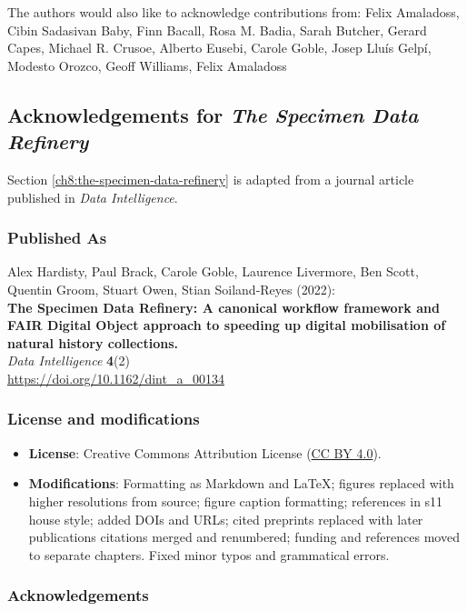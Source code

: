 The authors would also like to acknowledge contributions from: Felix
Amaladoss, Cibin Sadasivan Baby, Finn Bacall, Rosa M. Badia, Sarah
Butcher, Gerard Capes, Michael R. Crusoe, Alberto Eusebi, Carole Goble,
Josep Lluís Gelpí, Modesto Orozco, Geoff Williams, Felix Amaladoss


\subsection{Acknowledgements for \emph{The Specimen Data Refinery}}\label{ch11:refinery}

Section \vref{ch8:the-specimen-data-refinery} is adapted from a journal article published in \emph{Data Intelligence}.

\subsubsection*{Published As}

Alex Hardisty, Paul Brack, Carole Goble, Laurence Livermore, Ben Scott,
Quentin Groom, Stuart Owen, Stian Soiland-Reyes (2022):\\
\textbf{The Specimen Data Refinery: A canonical workflow framework and
FAIR Digital Object approach to speeding up digital mobilisation of
natural history collections.}\\
\emph{Data Intelligence} \textbf{4}(2)\\
\url{https://doi.org/10.1162/dint_a_00134}

\subsubsection*{License and modifications}

\begin{itemize}
\tightlist
\item
  \textbf{License}: Creative Commons Attribution License
  (\href{https://spdx.org/licenses/CC-BY-4.0}{CC BY 4.0}).
\item
  \textbf{Modifications}: Formatting as Markdown and LaTeX; figures replaced with higher resolutions from source; figure caption formatting; references in s11 house style; added DOIs and URLs; cited preprints replaced with later publications
  citations merged and renumbered; funding and references moved to separate chapters. Fixed minor typos and grammatical errors.
\end{itemize}


\subsubsection*{Acknowledgements}

